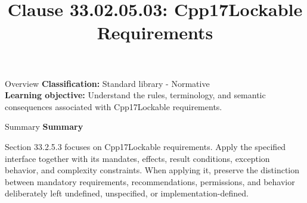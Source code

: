 \documentclass[10pt,letterpaper]{article}
\title{Clause 33.02.05.03: Cpp17Lockable Requirements}
\author{}
\date{}
\begin{document}
\maketitle
\begin{CornellOverviewBox}{Overview}
\textbf{Classification:} Standard library - Normative\\[2pt]
\textbf{Learning objective:} Understand the rules, terminology, and semantic consequences associated with Cpp17Lockable requirements.
\end{CornellOverviewBox}\begin{CornellSummaryBox}{Summary}
{\sffamily\bfseries\color{Accent} Summary}\par\vspace{3pt}Section 33.2.5.3 focuses on Cpp17Lockable requirements. Apply the specified interface together with its mandates, effects, result conditions, exception behavior, and complexity constraints. When applying it, preserve the distinction between mandatory requirements, recommendations, permissions, and behavior deliberately left undefined, unspecified, or implementation-defined.
\end{CornellSummaryBox}
\end{document}
